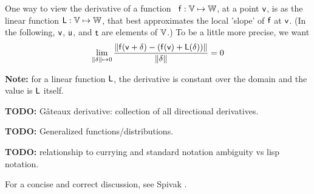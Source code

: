 \setcounter{currentlevel}{\value{baseSectionLevel}}
\label{sec:Derivatives}

One way to view the derivative of a 
function~\cite{wiki:Frechet-derivative}
$\mathsf{f}:\mathbb{V} \mapsto \mathbb{W}$,
at a point $\mathsf{v}$,
is as the linear function $\mathsf{L}:\mathbb{V} \mapsto \mathbb{W}$,
that best approximates the local 'slope' of $\mathsf{f}$ at $\mathsf{v}$.
(In the following, $\mathsf{v}$, $\mathsf{u}$, and $\mathsf{t}$ are elements of $\mathbb{V}$.)
To be a little more precise, we want
\begin{equation}
\lim_{ \|{\bf \delta}  \| \mapsto 0}
\frac{ \| \mathsf{f}(\mathsf{v} + {\bf \delta}) - (\mathsf{f}(\mathsf{v}) + \mathsf{L}({\bf\delta})) \|}
{\|{\bf \delta}  \| }
 = 0
\end{equation}

\textbf{Note:} for a linear function $\mathsf{L}$,
the derivative is constant over the domain
and the value is $\mathsf{L}$ itself.

\textbf{TODO:} G\^{a}teaux derivative: collection of all
directional derivatives.

\textbf{TODO:} Generalized functions/distributions.

\textbf{TODO:}
relationship to currying and standard notation ambiguity vs
lisp notation.

For a concise and correct discussion, 
see Spivak \cite[chapter 2]{spivak-1965}.

